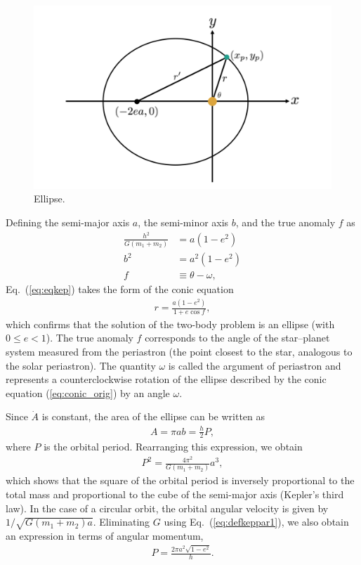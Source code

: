 \begin{figure}[]
 \begin{center}
	\includegraphics[bb=0 0 695 428,width=1.0\linewidth]{fig/ellip.png}
\end{center}
	\caption{Ellipse.}
	\label{fig:ellip}
\end{figure} 

Defining the semi-major axis $a$, the semi-minor axis $b$, and the true anomaly $f$ as
\begin{align}
\label{eq:defkeppar1}
\frac{h^2}{G (m_1 + m_2)} &= a (1 - e^2) \\
\label{eq:defkeppar2}
b^2 &= a^2 (1 - e^2) \\
\label{eq:defkeppar3}
f &\equiv \theta - \omega ,
\end{align}
Eq.~(\ref{eq:eqkep}) takes the form of the conic equation
\begin{align}
\label{eq:conic_kepler}
r = \frac{a (1-e^2)}{ 1 + e \cos{f}} ,
\end{align}
which confirms that the solution of the two-body problem is an ellipse (with $0 \le e < 1$). The true anomaly $f$ corresponds to the angle of the star–planet system measured from the periastron (the point closest to the star, analogous to the solar periastron). The quantity $\omega$ is called the argument of periastron and represents a counterclockwise rotation of the ellipse described by the conic equation (\ref{eq:conic_orig}) by an angle $\omega$.

Since $\dot{A}$ is constant, the area of the ellipse can be written as
\begin{align}
A = \pi a b = \frac{h}{2} P ,
\end{align}
where $P$ is the orbital period. Rearranging this expression, we obtain
\begin{align}
\label{eq:kep3}
P^2 = \frac{4 \pi^2}{G (m_1+m_2)} a^3 ,
\end{align}
which shows that the square of the orbital period is inversely proportional to the total mass and proportional to the cube of the semi-major axis (Kepler’s third law). In the case of a circular orbit, the orbital angular velocity is given by $1/\sqrt{G (m_1+m_2) a}$. Eliminating $G$ using Eq.~(\ref{eq:defkeppar1}), we also obtain an expression in terms of angular momentum,
\begin{align}
\label{eq:kep3_1}
P = \frac{2 \pi a^2 \sqrt{1-e^2}}{h} .
\end{align}

